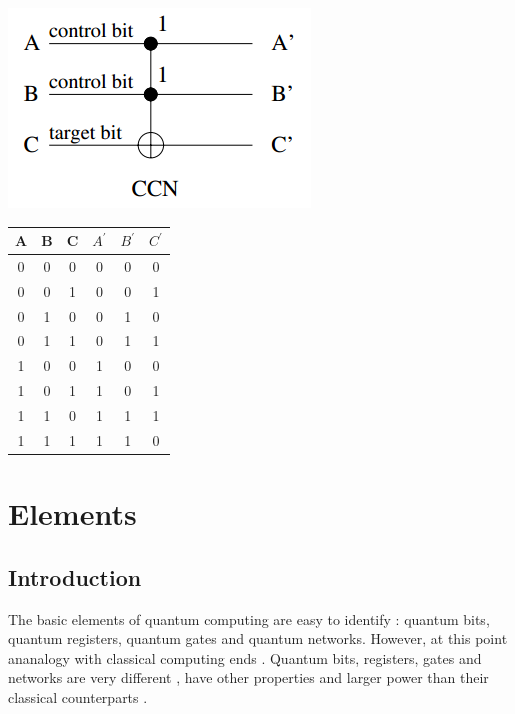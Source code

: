 \documentclass[12pt]{book}
\begin{document}
\newpage

\begin{center}
	\includegraphics[scale=1]{./reversible_3.png}
\end{center}

\begin{center}
  \begin{tabular}{ | c | c | c | c | c | c | }
  \hline
    A & B & C & $A^{\prime}$ & $B^{\prime}$ & $C^{\prime}$ \\ \hline
    0 & 0 & 0 & 0 & 0 & 0 \\ \hline
    0 & 0 & 1 & 0 & 0 & 1 \\ \hline
    0 & 1 & 0 & 0 & 1 & 0 \\ \hline
    0 & 1 & 1 & 0 & 1 & 1 \\ \hline
    1 & 0 & 0 & 1 & 0 & 0 \\ \hline
    1 & 0 & 1 & 1 & 0 & 1 \\ \hline
    1 & 1 & 0 & 1 & 1 & 1 \\ \hline
    1 & 1 & 1 & 1 & 1 & 0 \\
    \hline
  \end{tabular}
\end{center}


\chapter{Elements}


\section{Introduction}

The basic elements of quantum computing are easy to identify :
quantum bits, quantum
registers, quantum gates and quantum networks.  However, at this 
point ananalogy with
classical computing ends . Quantum bits, registers, gates and 
networks are very different ,
have other properties and larger power than their classical 
counterparts .
\end{document}
